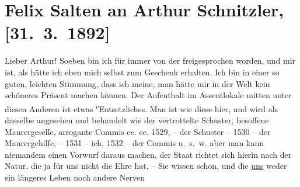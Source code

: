 

         
         \renewcommand{\erwaehntePersonen}{Personen:  ?? [Partnerin von Felix Salten, Ende März 1892], Felix Salten}
         \renewcommand{\erwaehnteOrte}{Orte: Café Kremser, Kettenbrücke, Wien}
         \renewcommand{\erwaehnteWerke}{Werke: Tagebuch}
               \section[Felix Salten an Arthur Schnitzler, {[}31. 3. 1892{]}]{ Felix Salten an Arthur Schnitzler, {[}31. 3. 1892{]}}\nopagebreak{}\rehead{ }\begin{ledgroupsized}[t]{13cm}\normalsize\beginnumbering{} \toendnotes[C]{\smallbreak\pagebreak[2]} 
\toendnotes[C]{\smallbreak}\pstart
           \noindent{}{\pb}Lieber Arthur! Soeben bin ich für immer von der
                  \label{K_L03108-1v}\label{K_L03108-1h}
               freigesprochen worden, und mir ist, als hätte ich eben mich selbst zum Geschenk
               erhalten. Ich bin in einer so guten, leichten Stimmung, dass ich meine, man hätte mir
               in der Welt kein schöneres Präsent machen können. Der Aufenthalt {\pb}im Assentlokale mitten
               unter diesen Anderen ist etwas \substVorne{}\textsuperscript{e}\substDazwischen{}E\substHinten{}ntsetzliches. Man ist wie diese hier, und wird als
               dasselbe angesehen und behandelt wie der vertrottelte Schuster, besoffene
               Maurergeselle, arrogante Commis ec. ec. 1529, – der Schuster – 1530 – der
               Maurergehilfe, – 1531 – ich, 1532 – der Commis u. s. w. aber man kann niemandem einen
               Vorwurf daraus machen, der Staat richtet {\pb}sich hierin nach der
               Natur, die ja für uns nicht die Ehre hat, – Sie wissen schon, und die \uline{uns} weder ein längeres Leben noch andere Nerven

\end{ledgroupsized}
